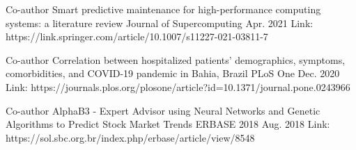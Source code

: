 

\begin{cventries}

  \cventry
    {Co-author}
    {Smart predictive maintenance for high-performance computing systems: a literature review}
    {Journal of Supercomputing}
    {Apr. 2021}
    {
        Link: https://link.springer.com/article/10.1007/s11227-021-03811-7
    }

  \cventry
    {Co-author} %
    {Correlation between hospitalized patients’ demographics, symptoms, comorbidities, and COVID-19 pandemic in Bahia, Brazil} %
    {PLoS One} %
    {Dec. 2020} %
    {
        Link: https://journals.plos.org/plosone/article?id=10.1371/journal.pone.0243966
    }

  \cventry
    {Co-author} %
    {AlphaB3 - Expert Advisor using Neural Networks and Genetic Algorithms to Predict Stock Market Trends} %
    {ERBASE 2018} %
    {Aug. 2018} %
    {
        Link: https://sol.sbc.org.br/index.php/erbase/article/view/8548
    }
\end{cventries}
